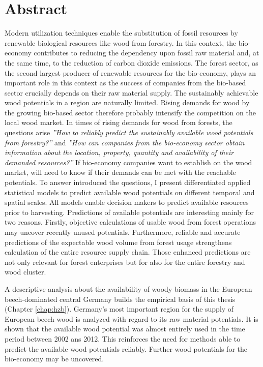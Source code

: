 \chapter*{Abstract}
\label{chap:Summary}
Modern utilization techniques enable the substitution of fossil resources by renewable biological resources like wood from forestry. In this context, the bio-economy contributes to reducing the dependency upon fossil raw material and, at the same time, to the reduction of carbon dioxide emissions. The forest sector, as the second largest producer of renewable resources for the bio-economy, plays an important role in this context as the success of companies from the bio-based sector crucially depends on their raw material supply. The sustainably achievable wood potentials in a region are naturally limited. Rising demands for wood by the growing bio-based sector therefore probably intensify the competition on the local wood market. In times of rising demands for wood from forests, the questions arise \textit{''How to reliably predict the sustainably available wood potentials from forestry?''} and \textit{''How can companies from the bio-economy sector obtain information about the location, property, quantity and availability of their demanded resources?''} If bio-economy companies want to establish on the wood market, will need to know if their demands can be met with the reachable potentials. To answer introduced the questions, I present differentiated applied statistical models to predict available wood potentials on different temporal and spatial scales. All models enable decision makers to predict available resources prior to harvesting. Predictions of available potentials are interesting mainly for two reasons. Firstly, objective calculations of usable wood from forest operations may uncover recently unused potentials. Furthermore, reliable and accurate predictions of the expectable wood volume from forest usage strengthens calculation of the entire resource supply chain. Those enhanced predictions are not only relevant for forest enterprises but for also for the entire forestry and wood cluster.

A descriptive analysis about the availability of woody biomass in the European beech-dominated central Germany builds the empirical basis of this thesis (Chapter \ref{chap:hzb}). Germany's most important region for the supply of European beech wood is analyzed with regard to its raw material potentials. It is shown that the available wood potential was almost entirely used in the time period between 2002 ans 2012. This reinforces the need for methods able to predict the available wood potentials reliably. Further wood potentials for the bio-economy may be uncovered.

